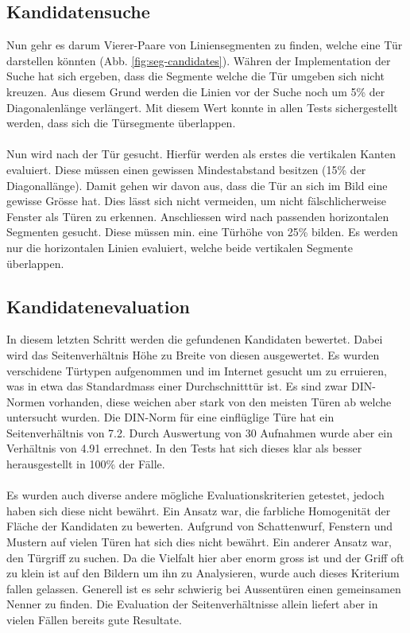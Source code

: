 \subsection{Kandidatensuche}
Nun gehr es darum Vierer-Paare von Liniensegmenten zu finden, welche eine Tür darstellen könnten (Abb. \ref{fig:seg-candidates}). Währen der Implementation der Suche hat sich ergeben, dass die Segmente welche die Tür umgeben sich nicht kreuzen. Aus diesem Grund werden die Linien vor der Suche noch um 5\% der Diagonalenlänge verlängert. Mit diesem Wert konnte in allen Tests sichergestellt werden, dass sich die Türsegmente überlappen. 
\paragraph{}
Nun wird nach der Tür gesucht. Hierfür werden als erstes die vertikalen Kanten evaluiert. Diese müssen einen gewissen Mindestabstand besitzen (15\% der Diagonallänge). Damit gehen wir davon aus, dass die Tür an sich im Bild eine gewisse Grösse hat. Dies lässt sich nicht vermeiden, um nicht fälschlicherweise Fenster als Türen zu erkennen. Anschliessen wird nach passenden horizontalen Segmenten gesucht. Diese müssen min. eine Türhöhe von 25\% bilden. Es werden nur die horizontalen Linien evaluiert, welche beide vertikalen Segmente überlappen.

\subsection{Kandidatenevaluation}
In diesem letzten Schritt werden die gefundenen Kandidaten bewertet. Dabei wird das Seitenverhältnis Höhe zu Breite von diesen ausgewertet. Es wurden verschidene Türtypen aufgenommen und im Internet gesucht um zu erruieren, was in etwa das Standardmass einer Durchschnitttür ist. Es sind zwar DIN-Normen vorhanden, diese weichen aber stark von den meisten Türen ab welche untersucht wurden. Die DIN-Norm für eine einflüglige Türe hat ein Seitenverhältnis von 7.2. Durch Auswertung von 30 Aufnahmen wurde aber ein Verhältnis von 4.91 errechnet. In den Tests hat sich dieses klar als besser herausgestellt in 100\% der Fälle. 
\paragraph{}
Es wurden auch diverse andere mögliche Evaluationskriterien getestet, jedoch haben sich diese nicht bewährt. Ein Ansatz war, die farbliche Homogenität der Fläche der Kandidaten zu bewerten. Aufgrund von Schattenwurf, Fenstern und Mustern auf vielen Türen hat sich dies nicht bewährt. Ein anderer Ansatz war, den Türgriff zu suchen. Da die Vielfalt hier aber enorm gross ist und der Griff oft zu klein ist auf den Bildern um ihn zu Analysieren, wurde auch dieses Kriterium fallen gelassen. Generell ist es sehr schwierig bei Aussentüren einen gemeinsamen Nenner zu finden. Die Evaluation der Seitenverhältnisse allein liefert aber in vielen Fällen bereits gute Resultate.

